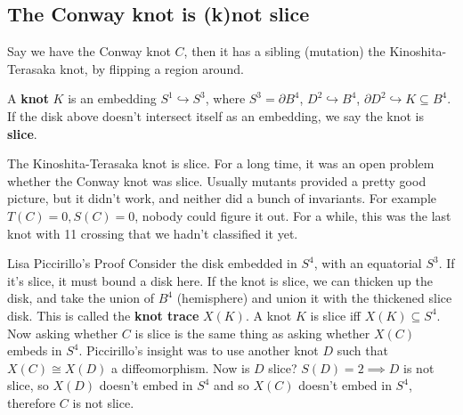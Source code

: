    \subsection{The Conway knot is (k)not slice}
Say we have the Conway knot $C$, then it has a sibling (mutation) the Kinoshita-Terasaka knot, by flipping a region around. 
\begin{definition}[Knot]
    A \textbf{knot} $K$ is an embedding $S^1 \hookrightarrow S^3$, where $S^3=\partial B^4$, $D^2\hookrightarrow B^4$, $\partial D^2\hookrightarrow K\subseteq B^4$. If the disk above doesn't intersect itself as an embedding, we say the knot is \textbf{slice}.
\end{definition}
The Kinoshita-Terasaka knot is slice. For a long time, it was an open problem whether the Conway knot was slice. Usually mutants provided a pretty good picture, but it didn't work, and neither did a bunch of invariants. For example $T(C)=0,S(C)=0$, nobody could figure it out. For a while, this was the last knot with 11 crossing that we hadn't classified it yet.
\begin{namedthing}{Lisa Piccirillo's Proof}
    Consider the disk embedded in $S^4$, with an equatorial $S^3$. If it's slice, it must bound a disk here. If the knot is slice, we can thicken up the disk, and take the union of $B^4$ (hemisphere) and union it with the thickened slice disk. This is called the \textbf{knot trace} $X(K)$. A knot $K$ is slice iff $X(K)\subseteq S^4$. Now asking whether $C$ is slice is the same thing as asking whether $X(C)$ embeds in $S^4$. Piccirillo's insight was to use another knot $D$ such that $X(C)\cong X(D)$ a diffeomorphism. Now is $D $ slice? $S(D)=2 \implies D$ is not slice, so  $X(D)$ doesn't embed in $S^4$ and so $X(C)$ doesn't embed in $S^4$, therefore $C$ is not slice.
\end{namedthing}
